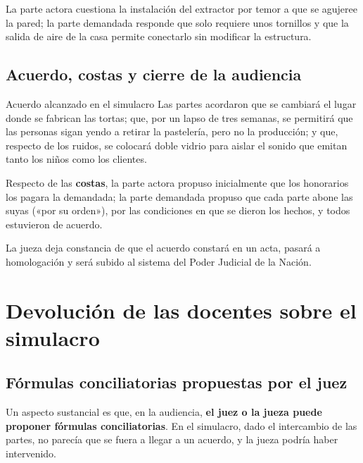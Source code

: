 \documentclass[12pt,oneside]{book}
\begin{document}
La parte actora cuestiona la instalación del extractor por temor a que se agujeree la pared; la parte demandada responde que solo requiere unos tornillos y que la salida de aire de la casa permite conectarlo sin modificar la estructura.

\section{Acuerdo, costas y cierre de la audiencia}

\begin{example}{Acuerdo alcanzado en el simulacro}
Las partes acordaron que se cambiará el lugar donde se fabrican las tortas; que, por un lapso de tres semanas, se permitirá que las personas sigan yendo a retirar la pastelería, pero no la producción; y que, respecto de los ruidos, se colocará doble vidrio para aislar el sonido que emitan tanto los niños como los clientes.

Respecto de las \textbf{costas}, la parte actora propuso inicialmente que los honorarios los pagara la demandada; la parte demandada propuso que cada parte abone las suyas («por su orden»), por las condiciones en que se dieron los hechos, y todos estuvieron de acuerdo.
\end{example}

La jueza deja constancia de que el acuerdo constará en un acta, pasará a homologación y será subido al sistema del Poder Judicial de la Nación.


\chapter[Devolución sobre el simulacro]{Devolución de las docentes sobre el simulacro}

\section{Fórmulas conciliatorias propuestas por el juez}

Un aspecto sustancial es que, en la audiencia, \textbf{el juez o la jueza puede proponer fórmulas conciliatorias}. En el simulacro, dado el intercambio de las partes, no parecía que se fuera a llegar a un acuerdo, y la jueza podría haber intervenido.
\end{document}
